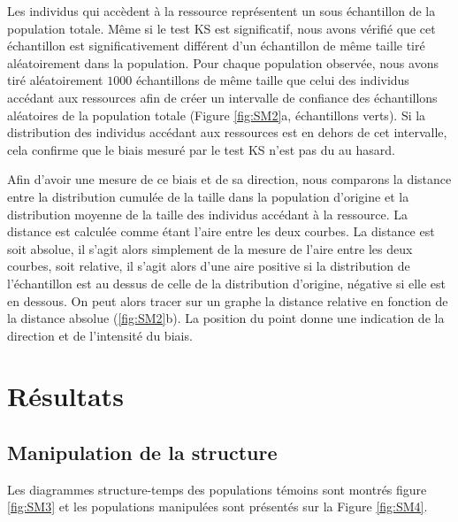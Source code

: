 Les individus qui accèdent à la ressource représentent un sous échantillon de la
population totale. Même si le test KS est significatif, nous avons vérifié que
cet échantillon est significativement différent d'un échantillon de même taille
tiré aléatoirement dans la population. Pour chaque population observée, nous
avons tiré aléatoirement $1000$ échantillons de même taille que celui des
individus accédant aux ressources afin de créer un intervalle de confiance des
échantillons aléatoires de la population totale (Figure \ref{fig:SM2}a,
échantillons verts). Si la distribution des individus accédant aux ressources
est en dehors de cet intervalle, cela confirme que le biais mesuré par le test KS
n'est pas du au hasard.

Afin d'avoir une mesure de ce biais et de sa direction, nous comparons la
distance entre la distribution cumulée de la taille dans la population d'origine
et la distribution moyenne de la taille des individus accédant à la ressource.
La distance est calculée comme étant l'aire entre les deux courbes. La distance
est soit absolue, il s'agit alors simplement de la mesure de l'aire entre les
deux courbes, soit relative, il s'agit alors d'une aire positive si la
distribution de l'échantillon est au dessus de celle de la distribution
d'origine, négative si elle est en dessous. On peut alors tracer sur un graphe
la distance relative en fonction de la distance absolue (\ref{fig:SM2}b). La
position du point donne une indication de la direction et de l'intensité du
biais.



\section{Résultats}

\subsection{Manipulation de la structure}

Les diagrammes structure-temps des populations témoins sont montrés figure
\ref{fig:SM3} et les populations manipulées sont présentés sur la Figure
\ref{fig:SM4}.


